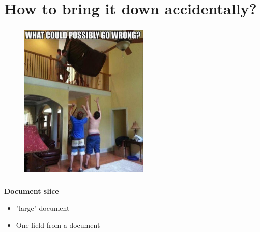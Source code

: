 \documentclass[usenames,dvipsnames, 18pt, compress, aspectratio=169]{beamer}
\begin{document}
\fontsize{13pt}{14}\selectfont
\section{How to bring it down accidentally?}
\fontsize{17pt}{18}\selectfont

\begin{frame}
    \frametitle{}
    \begin{center}
    \begin{figure}
        \includegraphics[width=0.55\textwidth,center]{wrong.jpg}
    \end{figure}
    \end{center}
\end{frame}

\begin{frame}
    \frametitle{}
    \begin{center}
        \textbf{Document slice}
        \begin{itemize}[label={}]
            \item "large" document
            \item One field from a document
        \end{itemize}
    \end{center}
\end{frame}
\end{document}
